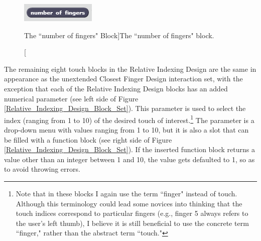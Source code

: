 \begin{figure}
\centering
\includegraphics{images/Number_Of_Fingers.PNG}
\caption[The ``number of fingers" Block]{The ``number of fingers" block.}
\label{Number_Of_Fingers}
\end{figure}

The remaining eight touch blocks in the Relative Indexing Design are the same in appearance as the unextended Closest Finger Design interaction set, with the exception that each of the Relative Indexing Design blocks has an added numerical parameter (see left side of Figure \ref{Relative_Indexing_Design_Block_Set}). This parameter is used to select the index (ranging from 1 to 10) of the desired touch of interest.\footnote{Note that in these blocks I again use the term ``finger" instead of touch. Although this terminology could lead some novices into thinking that the touch indices correspond to particular fingers (e.g., finger 5 always refers to the user's left thumb), I believe it is still beneficial to use the concrete term ``finger," rather than the abstract term ``touch."}
The parameter is a drop-down menu with values ranging from 1 to 10, but it is also a slot that can be filled with a function block (see right side of Figure \ref{Relative_Indexing_Design_Block_Set}). If the inserted function block returns a value other than an integer between 1 and 10, the value gets defaulted to 1, so as to avoid throwing errors.

